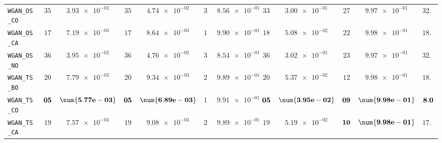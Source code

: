 \begin{table}[H]
\begin{tabularx}{\textwidth}{l||cC|cC|cC|cC|cC||c}
		\texttt{WGAN\_OS\_CO} & $ 35$ & $ \num{3.93e-02}$ & $ 35$ & $ \num{4.74e-02}$ & $ 30$ & $ \num{8.56e-01}$ & $ 33$ & $ \num{3.00e-01}$ & $ 27$ & $ \num{9.97e-01}$ & $ 32.0$  \\
		\texttt{WGAN\_OS\_CA} & $ 17$ & $ \num{7.19e-03}$ & $ 17$ & $ \num{8.64e-03}$ & $ 19$ & $ \num{9.90e-01}$ & $ 18$ & $ \num{5.08e-02}$ & $ 22$ & $ \num{9.98e-01}$ & $ 18.6$  \\
		\texttt{WGAN\_OS\_NO} & $ 36$ & $ \num{3.95e-02}$ & $ 36$ & $ \num{4.76e-02}$ & $ 32$ & $ \num{8.54e-01}$ & $ 36$ & $ \num{3.02e-01}$ & $ 23$ & $ \num{9.97e-01}$ & $ 32.6$  \\
		\texttt{WGAN\_TS\_BO} & $ 20$ & $ \num{7.79e-03}$ & $ 20$ & $ \num{9.34e-03}$ & $ 21$ & $ \num{9.89e-01}$ & $ 20$ & $ \num{5.37e-02}$ & $ 12$ & $ \num{9.98e-01}$ & $ 18.6$  \\
		\texttt{WGAN\_TS\_CO} & $\bf 05$ & $\bf \num{5.77e-03}$ & $\bf 05$ & $\bf \num{6.89e-03}$ & $ 16$ & $ \num{9.91e-01}$ & $\bf 05$ & $\bf \num{3.95e-02}$ & $\bf 09$ & $\bf \num{9.98e-01}$ & $\bf 8.0$  \\
		\texttt{WGAN\_TS\_CA} & $ 19$ & $ \num{7.57e-03}$ & $ 19$ & $ \num{9.08e-03}$ & $ 22$ & $ \num{9.89e-01}$ & $ 19$ & $ \num{5.19e-02}$ & $\bf 10$ & $\bf \num{9.98e-01}$ & $ 17.8$  \\

\end{tabularx}
\end{table}

